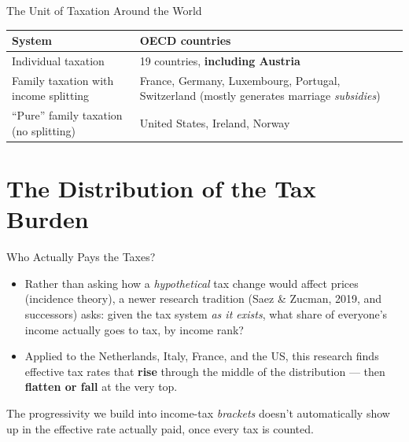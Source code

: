 \documentclass[11pt,aspectratio=169]{beamer}
\begin{document}
\begin{frame}{The Unit of Taxation Around the World}
	\footnotesize
	\begin{center}
		\begin{tabular}{@{}lp{7.5cm}@{}}
			\toprule
			\textbf{System} & \textbf{OECD countries} \\
			\midrule
			Individual taxation & 19 countries, \textbf{including Austria} \\
			Family taxation with income splitting & France, Germany, Luxembourg, Portugal, Switzerland (mostly generates marriage \emph{subsidies}) \\
			``Pure'' family taxation (no splitting) & United States, Ireland, Norway \\
			\bottomrule
		\end{tabular}
	\end{center}
	\vspace{0.3em}
	\centering

\end{frame}
\section{The Distribution of the Tax Burden}

\begin{frame}{Who Actually Pays the Taxes?}
  \begin{itemize}
    \item Rather than asking how a \emph{hypothetical} tax change would affect prices (incidence theory), a newer research tradition (Saez \& Zucman, 2019, and successors) asks: given the tax system \emph{as it exists}, what share of everyone's income actually goes to tax, by income rank?
    \item Applied to the Netherlands, Italy, France, and the US, this research finds effective tax rates that \textbf{rise} through the middle of the distribution --- then \textbf{flatten or fall} at the very top.
  \end{itemize}
  \vspace{0.3em}
 
  The progressivity we build into income-tax \emph{brackets} doesn't automatically show up in the effective rate actually paid, once every tax is counted. 
  \ 
\end{frame}
\end{document}
